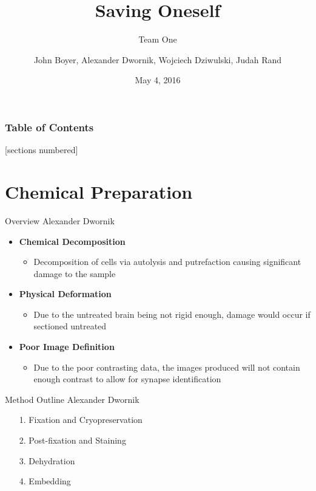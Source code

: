 \documentclass[10pt]{beamer}
\title{Saving Oneself}
\subtitle{Team One}
\date{May 4, 2016}
\author{John Boyer, Alexander Dwornik, Wojciech Dziwulski, Judah Rand}
\institute{University of Oxford}
\begin{document}
\maketitle

\begin{frame}
  \frametitle{Table of Contents}
  [sections numbered]
  \tableofcontents[hideallsubsections]
\end{frame}


\section{Chemical Preparation}
\begin{frame}{Overview \hspace{0pt plus 1 filll} \small{Alexander Dwornik}}

	\begin{itemize}[label={$\bullet$}]
		\item \textbf{Chemical Decomposition}
		\begin{itemize}[label={$\bullet$}]
			\item Decomposition of cells via autolysis and putrefaction causing significant damage to the sample
		\end{itemize}
		\item \textbf{Physical Deformation}
		\begin{itemize}[label={$\bullet$}]
			\item Due to the untreated brain being not rigid enough, damage would occur if sectioned untreated
		\end{itemize}
		\item \textbf{Poor Image Definition}
		\begin{itemize}[label={$\bullet$}]
			\item Due to the poor contrasting data, the images produced will not contain enough contrast to allow for synapse identification
		\end{itemize}
	\end{itemize}		
\end{frame}


\begin{frame}{Method Outline\hspace{0pt plus 1 filll} \small{Alexander Dwornik}}

\begin{itemize}
	\item [1.] Fixation and Cryopreservation
	\item [2.] Post-fixation and Staining
	\item [3.] Dehydration
	\item [4.] Embedding
\end{itemize}
\end{frame}
\end{document}
